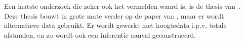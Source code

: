 Een laatste onderzoek die zeker ook het vermelden waard is, is de thesis
van~\citeauthor{Verdonck_2022}. Deze thesis bouwt in grote mate verder op de
paper van \citeauthor{Dhondt_Pochat_Voulimeneas_Joosen_Volckaert_2022}, maar er
wordt alternatieve data gebruikt. Er wordt gewerkt met hoogtedata i.p.v. totale
afstanden, en zo wordt ook een inferentie aanval geconstrueerd.

